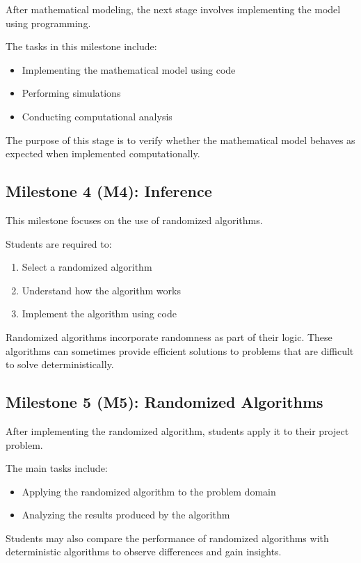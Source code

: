 \documentclass[12pt,a4paper]{article}
\begin{document}
After mathematical modeling, the next stage involves implementing the model using programming.

The tasks in this milestone include:

\begin{itemize}
\item Implementing the mathematical model using code
\item Performing simulations
\item Conducting computational analysis
\end{itemize}

The purpose of this stage is to verify whether the mathematical model behaves as expected when implemented computationally.

\subsection{Milestone 4 (M4): Inference}

This milestone focuses on the use of randomized algorithms.

Students are required to:

\begin{enumerate}
\item Select a randomized algorithm
\item Understand how the algorithm works
\item Implement the algorithm using code
\end{enumerate}

Randomized algorithms incorporate randomness as part of their logic. These algorithms can sometimes provide efficient solutions to problems that are difficult to solve deterministically.

\subsection{Milestone 5 (M5): Randomized Algorithms}

After implementing the randomized algorithm, students apply it to their project problem.

The main tasks include:

\begin{itemize}
\item Applying the randomized algorithm to the problem domain
\item Analyzing the results produced by the algorithm
\end{itemize}

Students may also compare the performance of randomized algorithms with deterministic algorithms to observe differences and gain insights.
\end{document}
